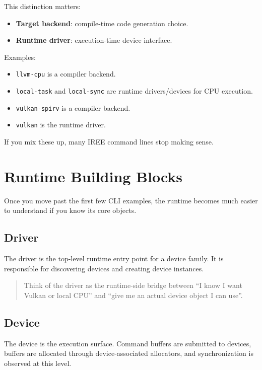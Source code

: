 \documentclass[11pt,a4paper]{article}
\begin{document}
This distinction matters:

\begin{itemize}
    \item \textbf{Target backend}: compile-time code generation choice.
    \item \textbf{Runtime driver}: execution-time device interface.
\end{itemize}

Examples:
\begin{itemize}
    \item \texttt{llvm-cpu} is a compiler backend.
    \item \texttt{local-task} and \texttt{local-sync} are runtime drivers/devices for CPU execution.
    \item \texttt{vulkan-spirv} is a compiler backend.
    \item \texttt{vulkan} is the runtime driver.
\end{itemize}

If you mix these up, many IREE command lines stop making sense.

\section{Runtime Building Blocks}

Once you move past the first few CLI examples, the runtime becomes much easier to understand if you know its core objects.

\subsection{Driver}

The driver is the top-level runtime entry point for a device family. It is responsible for discovering devices and creating device instances.

\begin{quote}
Think of the driver as the runtime-side bridge between ``I know I want Vulkan or local CPU'' and ``give me an actual device object I can use''.
\end{quote}

\subsection{Device}

The device is the execution surface. Command buffers are submitted to devices, buffers are allocated through device-associated allocators, and synchronization is observed at this level.
\end{document}
